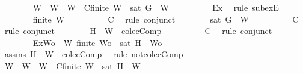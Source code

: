 \begin{isabellebody}
\ \ \ \ \ \ \isamarkupfalse%
\ W{}\ \ {\isachardoublequoteopen}W{}\ {\isasymsubseteq}\ W{\isachardoublequoteclose}\ \ C{}{\isacharcolon}{\isachardoublequoteopen}finite\ W{}\ {\isasymand}\ {\isasymnot}{\isacharparenleft}sat\ {\isacharparenleft}{\isacharbraceleft}G{\isacharbraceright}\ {\isasymunion}\ W{}{\isacharparenright}{\isacharparenright}{\isachardoublequoteclose}\isanewline
\ \ \ \ \ \ \ \ \isamarkupfalse%
\ Ex{}\ \isamarkupfalse%
\ {\isacharparenleft}rule\ subexE{\isacharparenright}\isanewline
\ \ \ \ \ \ \isamarkupfalse%
\ {\isachardoublequoteopen}finite\ W{}{\isachardoublequoteclose}\isanewline
\ \ \ \ \ \ \ \ \isamarkupfalse%
\ C{}\ \isamarkupfalse%
\ {\isacharparenleft}rule\ conjunct{}{\isacharparenright}\isanewline
\ \ \ \ \ \ \isamarkupfalse%
\ {\isachardoublequoteopen}{\isasymnot}{\isacharparenleft}sat\ {\isacharparenleft}{\isacharbraceleft}G{\isacharbraceright}\ {\isasymunion}\ W{}{\isacharparenright}{\isacharparenright}{\isachardoublequoteclose}\isanewline
\ \ \ \ \ \ \ \ \isamarkupfalse%
\ C{}\ \isamarkupfalse%
\ {\isacharparenleft}rule\ conjunct{}{\isacharparenright}\isanewline
\ \ \ \ \ \ \isamarkupfalse%
\ {\isachardoublequoteopen}{\isacharbraceleft}H{\isacharbraceright}\ {\isasymunion}\ W\ {\isasymnotin}\ colecComp{\isachardoublequoteclose}\isanewline
\ \ \ \ \ \ \ \ \isamarkupfalse%
\ C\ \isamarkupfalse%
\ {\isacharparenleft}rule\ conjunct{}{\isacharparenright}\ \isanewline
\ \ \ \ \ \ \isamarkupfalse%
\ Ex{}{\isacharcolon}{\isachardoublequoteopen}{\isasymexists}Wo\ {\isasymsubseteq}\ W{\isachardot}\ finite\ Wo\ {\isasymand}\ {\isasymnot}{\isacharparenleft}sat\ {\isacharparenleft}{\isacharbraceleft}H{\isacharbraceright}\ {\isasymunion}\ Wo{\isacharparenright}{\isacharparenright}{\isachardoublequoteclose}\isanewline
\ \ \ \ \ \ \ \ \isamarkupfalse%
\ assms\ {\isacartoucheopen}{\isacharbraceleft}H{\isacharbraceright}\ {\isasymunion}\ W\ {\isasymnotin}\ colecComp{\isacartoucheclose}\ \isamarkupfalse%
\ {\isacharparenleft}rule\ not{\isacharunderscore}colecComp{\isacharparenright}\isanewline
\ \ \ \ \ \ \isamarkupfalse%
\ W{}\ \ {\isachardoublequoteopen}W{}\ {\isasymsubseteq}\ W{\isachardoublequoteclose}\ \ C{}{\isacharcolon}{\isachardoublequoteopen}finite\ W{}\ {\isasymand}\ {\isasymnot}{\isacharparenleft}sat\ {\isacharparenleft}{\isacharbraceleft}H{\isacharbraceright}\ {\isasymunion}\ W{}{\isacharparenright}{\isacharparenright}{\isachardoublequoteclose}\isanewline

\end{isabellebody}
